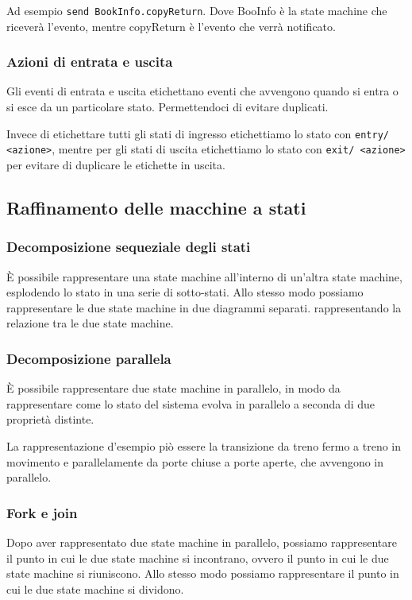 Ad esempio \texttt{send BookInfo.copyReturn}. Dove BooInfo è la state machine che
riceverà l'evento, mentre copyReturn è l'evento che verrà notificato.
\subsubsection{Azioni di entrata e uscita}
Gli eventi di entrata e uscita etichettano eventi che avvengono quando si entra o si esce
da un particolare stato. Permettendoci di evitare duplicati.

Invece di etichettare tutti gli stati di ingresso etichettiamo lo stato con 
\texttt{entry/ <azione>}, mentre per gli stati di uscita etichettiamo lo stato con
\texttt{exit/ <azione>} per evitare di duplicare le etichette in uscita.
\subsection{Raffinamento delle macchine a stati}
\subsubsection{Decomposizione sequeziale degli stati}
È possibile rappresentare una state machine all'interno di un'altra state machine,
esplodendo lo stato in una serie di sotto-stati. Allo stesso modo possiamo rappresentare 
le due state machine in due diagrammi separati. rappresentando la relazione tra le due
state machine.
\subsubsection{Decomposizione parallela}
È possibile rappresentare due state machine in parallelo, in modo da rappresentare
come lo stato del sistema evolva in parallelo a seconda di due proprietà distinte.

La rappresentazione d'esempio piò essere la transizione da treno fermo a treno in movimento 
e parallelamente da porte chiuse a porte aperte, che avvengono in parallelo.

\subsubsection{Fork e join}
Dopo aver rappresentato due state machine in parallelo, possiamo rappresentare
il punto in cui le due state machine si incontrano, ovvero il punto in cui
le due state machine si riuniscono. Allo stesso modo possiamo rappresentare
il punto in cui le due state machine si dividono.

